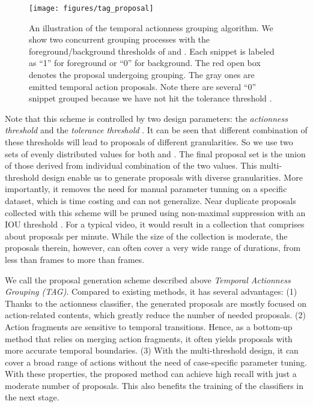 \documentclass[10pt,twocolumn,letterpaper]{article}
\begin{document}
\begin{figure}
\centering
\texttt{[image: figures/tag\_proposal]}
\caption{An illustration of the temporal actionness grouping algorithm.
	We show two concurrent grouping processes with the foreground/background thresholds  of  and .
	Each snippet is labeled as ``1'' for foreground or ``0'' for background. The red open box denotes the proposal undergoing grouping. The gray ones are emitted temporal action proposals.
	Note there are several ``0'' snippet grouped because we have not hit the tolerance threshold .}
\label{fig:tag}
\end{figure}



Note that this scheme is controlled by two design parameters:
the \emph{actionness threshold}  and the \emph{tolerance threshold} .
It can be seen that different combination of these thresholds will lead to proposals of 
different granularities.
So we use two sets of evenly distributed values for both  and .
The final proposal set is the union of those derived from individual combination of the two values.
This multi-threshold design enable us to generate proposals with diverse granularities.
More importantly, it removes the need for manual parameter tunning on a specific dataset, which is time costing and can not generalize.
Near duplicate proposals collected with this scheme will be pruned using non-maximal suppression 
with an IOU threshold .
For a typical video, it would result in a collection that comprises about 
 proposals per minute. 
While the size of the collection is moderate, the proposals therein, however, can often 
cover a very wide range of durations, 
from less than  frames to more than  frames. 

We call the proposal generation scheme described above 
\emph{Temporal Actionness Grouping (TAG)}.
Compared to existing methods, it has several advantages:
(1) Thanks to the actionness classifier, the generated proposals are mostly 
focused on action-related contents, which greatly reduce the number of needed proposals.
(2) Action fragments are sensitive to temporal transitions. 
Hence, as a bottom-up method that relies on merging action fragments, 
it often yields proposals with more accurate temporal boundaries. 
(3) With the multi-threshold design, it can cover a broad range of actions
without the need of case-specific parameter tuning.
With these properties, the proposed method can achieve high recall with 
just a moderate number of proposals. 
This also benefits the training of the classifiers in the next stage.
 
\end{document}
